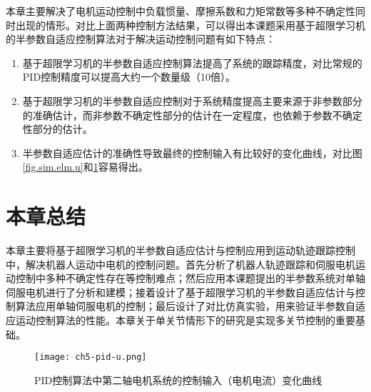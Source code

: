 本章主要解决了电机运动控制中负载惯量、摩擦系数和力矩常数等多种不确定性同时出现的情形。对比上面两种控制方法结果，可以得出本课题采用基于超限学习机的半参数自适应控制算法对于解决运动控制问题有如下特点：
\begin{enumerate}
\item 基于超限学习机的半参数自适应控制算法提高了系统的跟踪精度，对比常规的PID控制精度可以提高大约一个数量级（10倍）。
\item 基于超限学习机的半参数自适应控制对于系统精度提高主要来源于非参数部分的准确估计，而非参数不确定性部分的估计在一定程度，也依赖于参数不确定性部分的估计。
\item 半参数自适应估计的准确性导致最终的控制输入有比较好的变化曲线，对比图\ref{fig.sim.elm.u}和\ref{fig.sim.pid.u}容易得出。
\end{enumerate}

\section{本章总结}
本章主要将基于超限学习机的半参数自适应估计与控制应用到运动轨迹跟踪控制中，解决机器人运动中电机的控制问题。首先分析了机器人轨迹跟踪和伺服电机运动控制中多种不确定性存在等控制难点；然后应用本课题提出的半参数系统对单轴伺服电机进行了分析和建模；接着设计了基于超限学习机的半参数自适应估计与控制算法应用单轴伺服电机的控制；最后设计了对比仿真实验，用来验证半参数自适应运动控制算法的性能。本章关于单关节情形下的研究是实现多关节控制的重要基础。

\begin{figure}[!htb]
	\centering
	\texttt{[image: ch5-pid-u.png]}\\	 %
	\caption{PID控制算法中第二轴电机系统的控制输入（电机电流）变化曲线}
	\label{fig.sim.pid.u}
\end{figure}